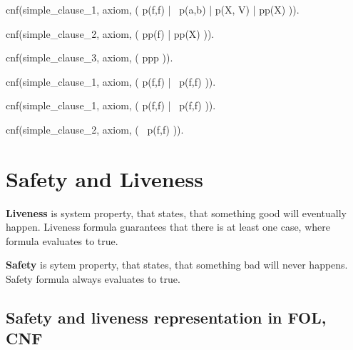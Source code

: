 \begin{tptpcode}
cnf(simple_clause_1, axiom,
    ( p(f,f) | ~p(a,b) | p(X, V) | pp(X) )).

cnf(simple_clause_2, axiom,
    ( pp(f) | pp(X) )).

cnf(simple_clause_3, axiom,
    ( ppp )).

\end{tptpcode}

\begin{tptpcode}
cnf(simple_clause_1, axiom,
    ( p(f,f) | ~p(f,f) )).

\end{tptpcode}

\begin{tptpcode}
cnf(simple_clause_1, axiom,
    ( p(f,f) | ~p(f,f) )).

cnf(simple_clause_2, axiom,
    ( ~p(f,f) )).

\end{tptpcode}

\section{Safety and Liveness}

\textbf{Liveness} is system property, that states, that something good will eventually happen.
Liveness formula guarantees that there is at least one case, where formula evaluates to true.

\textbf{Safety} is sytem property, that states, that something bad will never happens.
Safety formula always evaluates to true.

\subsection{Safety and liveness representation in FOL, CNF}

